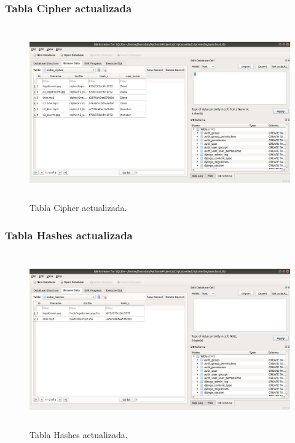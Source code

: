 \subsubsection{Tabla Cipher actualizada}

			\begin{figure}[H]
			\centering
			\includegraphics[width=14cm, height=7.5cm]{./images/Implementacion/TablaCipherOtroUsuarioActualizada.png}
			\caption{Tabla Cipher actualizada.}
			\label{fig:6-1-25} 
			\end{figure}

\subsubsection{Tabla Hashes actualizada}

			\begin{figure}[H]
			\centering
			\includegraphics[width=14cm, height=7.5cm]{./images/Implementacion/TablaHashesOtroUsuarioActualizada.png}
			\caption{Tabla Hashes actualizada.}
			\label{fig:6-1-26} 
			\end{figure}

